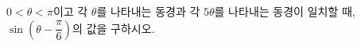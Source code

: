 $0<\theta<\pi$이고 각 $\theta$를 나타내는 동경과 각 $5\theta$를 나타내는 동경이 일치할 때, $\sin\left(\theta-\dfrac{\pi}{6}\right)$의 값을 구하시오.
